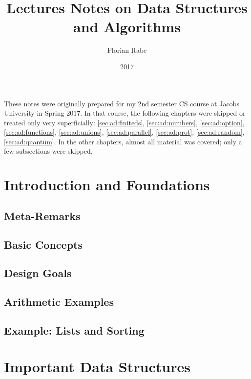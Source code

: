 \documentclass{book}
\title{Lectures Notes on Data Structures and Algorithms}
\author{Florian Rabe}
\date{2017}
\begin{document}
\maketitle


\tableofcontents

\bigskip

These notes were originally prepared for my 2nd semester CS course at Jacobs University in Spring 2017.
In that course, the following chapters were skipped or treated only very superficially: \ref{sec:ad:finiteds}, \ref{sec:ad:numbers}, \ref{sec:ad:option}, \ref{sec:ad:functions}, \ref{sec:ad:unions}, \ref{sec:ad:parallel}, \ref{sec:ad:prot}, \ref{sec:ad:random}, \ref{sec:ad:quantum}.
In the other chapters, almost all material was covered; only a few subsections were skipped.
\newpage

\part{Introduction and Foundations}

\chapter{Meta-Remarks}
 

\chapter{Basic Concepts}\label{sec:ad:fund}
  

\chapter{Design Goals}\label{sec:ad:goals}
  

\chapter{Arithmetic Examples}\label{sec:ad:arithex}
  
  
\chapter{Example: Lists and Sorting}\label{sec:ad:sort}
  

\part{Important Data Structures}\label{sec:ad:ds}
\end{document}
